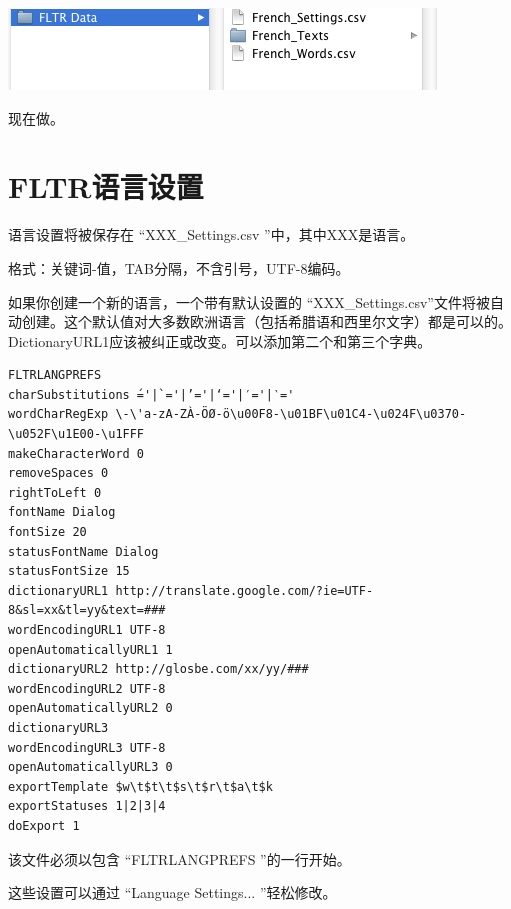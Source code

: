 \documentclass[cn,10pt,math=newtx,citestyle=gb7714-2015,bibstyle=gb7714-2015]{elegantbook}
\begin{document}
\includegraphics[scale=0.6]{image/images-026.png}

现在做。


\chapter{FLTR语言设置}
\label{FLTR语言设置}
语言设置将被保存在 “XXX\_Settings.csv ”中，其中XXX是语言。

格式：关键词-值，TAB分隔，不含引号，UTF-8编码。

如果你创建一个新的语言，一个带有默认设置的 “XXX\_Settings.csv”文件将被自动创建。这个默认值对大多数欧洲语言（包括希腊语和西里尔文字）都是可以的。
DictionaryURL1应该被纠正或改变。可以添加第二个和第三个字典。

\lstset{showstringspaces=false} %
\begin{lstlisting}
FLTRLANGPREFS
charSubstitutions ́='|`='|’='|‘='|′='|‵='
wordCharRegExp \-\'a-zA-ZÀ-ÖØ-ö\u00F8-\u01BF\u01C4-\u024F\u0370-\u052F\u1E00-\u1FFF
makeCharacterWord 0
removeSpaces 0
rightToLeft 0
fontName Dialog
fontSize 20
statusFontName Dialog
statusFontSize 15
dictionaryURL1 http://translate.google.com/?ie=UTF-8&sl=xx&tl=yy&text=###
wordEncodingURL1 UTF-8
openAutomaticallyURL1 1
dictionaryURL2 http://glosbe.com/xx/yy/###
wordEncodingURL2 UTF-8
openAutomaticallyURL2 0
dictionaryURL3
wordEncodingURL3 UTF-8
openAutomaticallyURL3 0
exportTemplate $w\t$t\t$s\t$r\t$a\t$k
exportStatuses 1|2|3|4
doExport 1
\end{lstlisting}

该文件必须以包含 “FLTRLANGPREFS ”的一行开始。



这些设置可以通过 “Language Settings... ”轻松修改。
\end{document}
